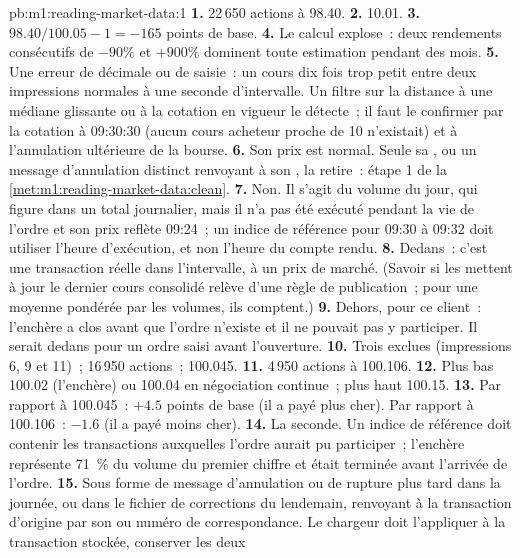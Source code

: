 \begin{solution}{pb:m1:reading-market-data:1}
\textbf{1.} 22\,650 actions à 98.40.
\textbf{2.} 10.01.
\textbf{3.} $98.40/100.05 - 1 = -165$ points de base.
\textbf{4.} Le calcul explose~: deux rendements consécutifs de $-90\%$ et $+900\%$ dominent
toute estimation pendant des mois.
\textbf{5.} Une erreur de décimale ou de saisie~: un cours dix fois trop petit entre
deux impressions normales à une seconde d'intervalle. Un filtre sur la distance à une médiane glissante
ou à la cotation en vigueur le détecte~; il faut le confirmer par la cotation à
09:30:30 (aucun cours acheteur proche de 10 n'existait) et à l'annulation ultérieure
de la bourse.
\textbf{6.} Son prix est normal. Seule sa , ou un message d'annulation distinct
renvoyant à son , la retire~: étape 1 de la
\cref{met:m1:reading-market-data:clean}.
\textbf{7.} Non. Il s'agit du volume du jour, qui figure dans un total journalier, mais il
n'a pas été exécuté pendant la vie de l'ordre et son prix reflète 09:24~; un indice de référence
pour 09:30 à 09:32 doit utiliser l'heure d'exécution, et non l'heure du
compte rendu.
\textbf{8.} Dedans~: c'est une transaction réelle dans l'intervalle, à un prix de marché.
(Savoir si les  mettent à jour le dernier cours consolidé relève d'une règle de publication~;
pour une moyenne pondérée par les volumes, ils comptent.)
\textbf{9.} Dehors, pour ce client~: l'enchère a clos avant que l'ordre n'existe
et il ne pouvait pas y participer. Il serait dedans pour un ordre saisi avant
l'ouverture.
\textbf{10.} Trois exclues (impressions 6, 9 et 11)~; 16\,950 actions~; 100.045.
\textbf{11.} 4\,950 actions à 100.106.
\textbf{12.} Plus bas 100.02 (l'enchère) ou 100.04 en négociation continue~; plus haut
100.15.
\textbf{13.} Par rapport à 100.045~: $+4.5$ points de base (il a payé plus cher). Par rapport à
100.106~: $-1.6$ (il a payé moins cher).
\textbf{14.} La seconde. Un indice de référence doit contenir les transactions auxquelles l'ordre aurait pu
participer~; l'enchère représente 71~\% du volume du premier chiffre
et était terminée avant l'arrivée de l'ordre.
\textbf{15.} Sous forme de message d'annulation ou de rupture plus tard dans la journée, ou dans le
fichier de corrections du lendemain, renvoyant à la transaction d'origine par son  ou
numéro de correspondance. Le chargeur doit l'appliquer à la transaction stockée, conserver les deux

\end{solution}
